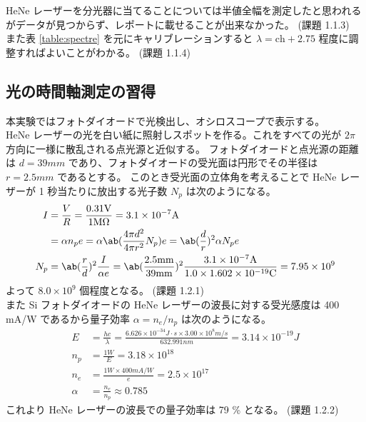 \documentclass[uplatex,dvipdfmx,a4paper,11pt]{jlreq}
\numberwithin{equation}{section}
\theoremstyle{definition}
\begin{document}
HeNe レーザーを分光器に当てることについては半値全幅を測定したと思われるがデータが見つからず、レポートに載せることが出来なかった。
(課題 1.1.3) \\

また表 \ref{table:spectre} を元にキャリブレーションすると $\lambda = \mathrm{ch} + 2.75$ 程度に調整すればよいことがわかる。
(課題 1.1.4)

\subsection{光の時間軸測定の習得}

本実験ではフォトダイオードで光検出し、オシロスコープで表示する。 \\

HeNe レーザーの光を白い紙に照射しスポットを作る。これをすべての光が $2\pi$ 方向に一様に散乱される点光源と近似する。
フォトダイオードと点光源の距離は $d = 39\si{mm}$ であり、フォトダイオードの受光面は円形でその半径は $r = 2.5\si{mm}$ であるとする。
このとき受光面の立体角を考えることで HeNe レーザーが 1 秒当たりに放出する光子数 $N_p$ は次のようになる。
\begin{align}
  I   & = \frac{V}{R} = \frac{0.31\si{V}}{1\si{M\ohm}} = 3.1\times 10^{-7}\si{A}                                                                                              \\
      & = \alpha n_pe = \alpha\ab(\frac{4\pi d^2}{4\pi r^2}N_p)e = \ab(\frac{d}{r})^2\alpha N_pe                                                                              \\
  N_p & = \ab(\frac{r}{d})^2\frac{I}{\alpha e} = \ab(\frac{2.5\si{mm}}{39\si{mm}})^2\frac{3.1\times 10^{-7}\si{A}}{1.0\times 1.602\times 10^{-19}\si{C}} = 7.95 \times 10^{9}
\end{align}
よって $8.0\times 10^9$ 個程度となる。 (課題 1.2.1) \\

また Si フォトダイオードの HeNe レーザーの波長に対する受光感度は 400 \si{mA/W} であるから量子効率 $\alpha = n_e / n_p$ は次のようになる。
\begin{align}
  E      & = \frac{hc}{\lambda} = \frac{6.626\times 10^{-34}\si{J\cdot s}\times 3.00\times 10^8\si{m/s}}{632.991\si{nm}} = 3.14\times 10^{-19}\si{J} \\
  n_p    & = \frac{1\si{W}}{E} = 3.18\times 10^{18}                                                                                                  \\
  n_e    & = \frac{1\si{W}\times 400\si{mA/W}}{e} = 2.5\times 10^{17}                                                                                \\
  \alpha & = \frac{n_e}{n_p} \approx 0.785
\end{align}
これより HeNe レーザーの波長での量子効率は 79 \% となる。 (課題 1.2.2) \\
\end{document}
